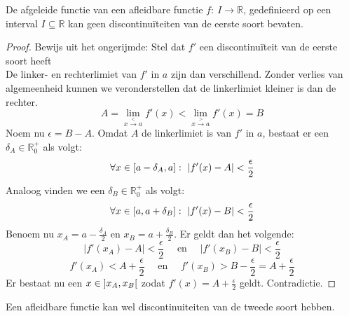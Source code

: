 \documentclass[main.tex]{subfiles}
\begin{document}
\begin{gev}
  De afgeleide functie van een afleidbare functie $f:\ I \rightarrow \mathbb{R}$, gedefinieerd op een interval $I \subseteq \mathbb{R}$ kan geen discontinu\"iteiten van de eerste soort bevaten.

  \begin{proof}
    Bewijs uit het ongerijmde: Stel dat $f'$ een discontinu\"iteit van de eerste soort heeft\\
    De linker- en rechterlimiet van $f'$ in $a$ zijn dan verschillend.
    Zonder verlies van algemeenheid kunnen we veronderstellen dat de linkerlimiet kleiner is dan de rechter.\waarom
    \[ A = \lim_{x \overset{<}{\rightarrow} a}f'(x) < \lim_{x \overset{>}{\rightarrow} a}f'(x) = B \]
    Noem nu $\epsilon = B-A$.
    Omdat $A$ de linkerlimiet is van $f'$ in $a$, bestaat er een $\delta_{A} \in \mathbb{R}_{0}^{+}$ als volgt:
    \[ \forall x\in \interval{a-\delta_{A}}{a}:\ |f'(x)-A| < \frac{\epsilon}{2} \]
    Analoog vinden we een $\delta_{B} \in \mathbb{R}_{0}^{+}$ als volgt:
    \[ \forall x\in \interval{a}{a+\delta_{B}}:\ |f'(x)-B| < \frac{\epsilon}{2} \]
    Benoem nu $x_{A} = a-\frac{\delta_{A}}{2}$ en $x_{B} = a+\frac{\delta_{B}}{2}$.
    Er geldt dan het volgende:
    \[ |f'(x_{A})-A| < \frac{\epsilon}{2} \quad\text{ en }\quad |f'(x_{B})-B| < \frac{\epsilon}{2} \]
    \[ f'(x_{A}) < A + \frac{\epsilon}{2} \quad\text{ en }\quad f'(x_{B}) > B- \frac{\epsilon}{2} = A + \frac{\epsilon}{2} \]
    Er bestaat nu een $x \in \interval[open]{x_{A}}{x_{B}}$ zodat $f'(x) = A + \frac{\epsilon}{2}$ geldt.
    Contradictie.
  \end{proof}
\end{gev}

\begin{opm}
  Een afleidbare functie kan wel discontinuiteiten van de tweede soort hebben.
\end{opm}
\end{document}
